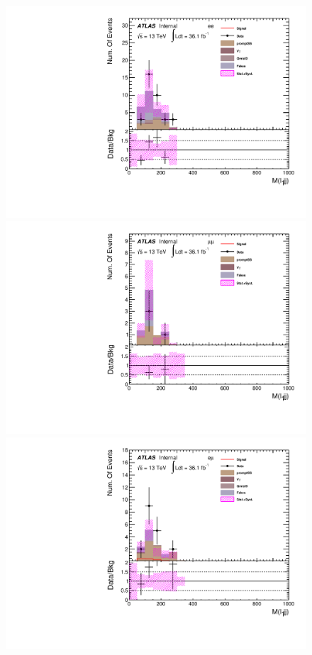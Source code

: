 \begin{figure}[h]
\begin{minipage}[t]{0.33\linewidth}
 \centering
 \includegraphics[width=1.0\textwidth,angle=-90]{fig/SigOpt/nonres_m_l1jj_ee.pdf}
 \end{minipage}
 \begin{minipage}[t]{0.33\linewidth}
 \centering
 \includegraphics[width=1.0\textwidth,angle=-90]{fig/SigOpt/nonres_m_l1jj_mumu.pdf}
 \end{minipage}
 \begin{minipage}[t]{0.33\linewidth}
 \centering
 \includegraphics[width=1.0\textwidth,angle=-90]{fig/SigOpt/nonres_m_l1jj_emu.pdf}

\end{minipage}
\end{figure}
